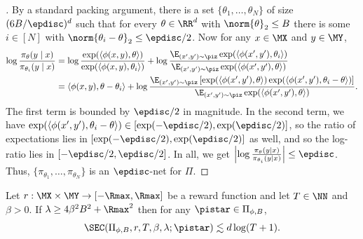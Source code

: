 \begin{proof}[]
By a standard packing argument, there is a set $\{\theta_1,\dots,\theta_N\}$ of size $(6B/\epdisc)^d$ such that for every $\theta \in \RR^d$ with $\norm{\theta}_2 \leq B$ there is some $i \in [N]$ with $\norm{\theta_i - \theta}_2 \leq \epdisc/2$. Now for any $x\in\MX$ and $y \in \MY$,
\begin{align}
\log \frac{\pi_{\theta}(y\mid x)}{\pi_{\theta_i}(y\mid x)} 
&= \log \frac{\exp(\langle \phi(x,y),\theta\rangle)}{\exp(\langle \phi(x,y),\theta_i\rangle)} + \log \frac{\E_{(x',y')\sim \piz} \exp(\langle \phi(x',y'), \theta_i\rangle)}{\E_{(x',y')\sim \piz} \exp(\langle \phi(x',y'), \theta\rangle)} \\ 
&= \langle \phi(x,y),\theta-\theta_i\rangle + \log \frac{\E_{(x',y')\sim \piz} \left[\exp(\langle \phi(x',y'), \theta\rangle)\exp(\langle \phi(x',y'), \theta_i-\theta\rangle)\right]}{\E_{(x',y')\sim \piz} \exp(\langle \phi(x',y'), \theta\rangle)}.
\end{align}
The first term is bounded by $\epdisc/2$ in magnitude. In the second term, we have $\exp(\langle \phi(x',y'),\theta_i-\theta\rangle) \in [\exp(-\epdisc/2),\exp(\epdisc/2)]$, so the ratio of expectations lies in $[\exp(-\epdisc/2),\exp(\epdisc/2)]$ as well, and so the log-ratio lies in $[-\epdisc/2,\epdisc/2]$. In all, we get $\left|\log \frac{\pi_{\theta}(y|x)}{\pi_{\theta_i}(y\mid x)}\right| \leq \epdisc$. Thus, $\{\pi_{\theta_1},\dots,\pi_{\theta_N}\}$ is an $\epdisc$-net for $\Pi$.
\end{proof}

\begin{lemma}\label{lemma:sec-softmax-bound}
Let $r:\MX\times\MY \to [-\Rmax,\Rmax]$ be a reward function and let $T \in \NN$ and $\beta>0$. If $\lambda \geq 4\beta^2 B^2 + \Rmax^2$ then for any $\pistar \in \Pi_{\phi,B}$,
\[\SEC(\Pi_{\phi,B}, r,T, \beta,\lambda; \pistar) \lesssim d\log(T+1).\]
\end{lemma}

